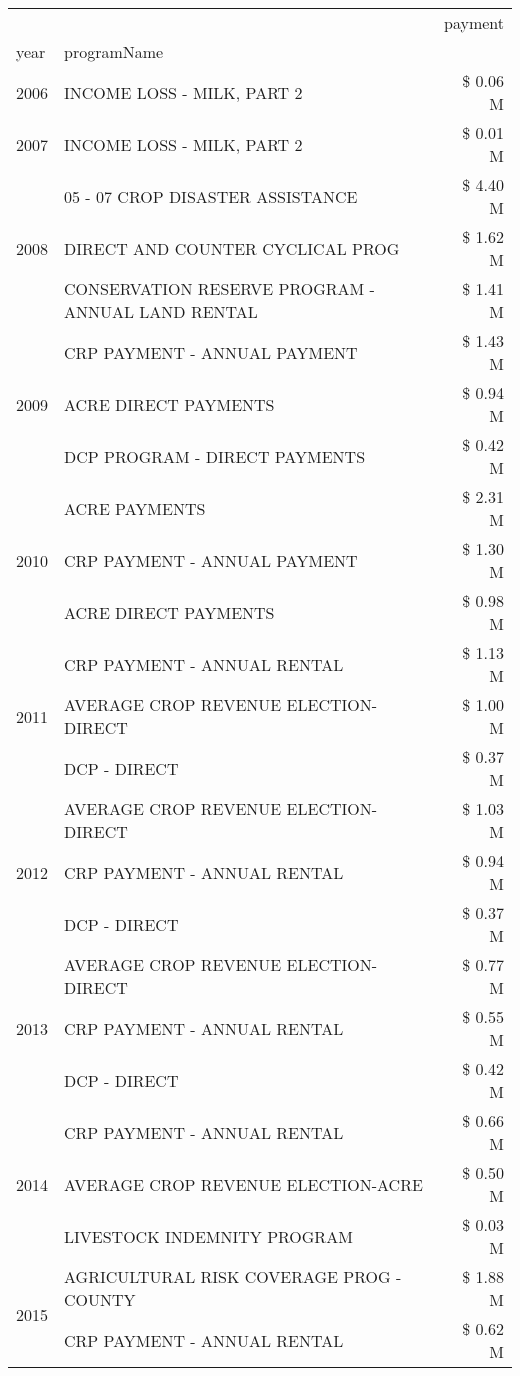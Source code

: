\begin{tabular}{llr}
\toprule
 &  & payment \\
year & programName &  \\
\midrule
2006 & INCOME LOSS - MILK, PART 2 & \$ 0.06 M \\
\cline{1-3}
2007 & INCOME LOSS - MILK, PART 2 & \$ 0.01 M \\
\cline{1-3}
\multirow[t]{3}{*}{2008} & 05 - 07 CROP DISASTER ASSISTANCE & \$ 4.40 M \\
 & DIRECT AND COUNTER CYCLICAL PROG & \$ 1.62 M \\
 & CONSERVATION RESERVE PROGRAM - ANNUAL LAND RENTAL & \$ 1.41 M \\
\cline{1-3}
\multirow[t]{3}{*}{2009} & CRP PAYMENT - ANNUAL PAYMENT & \$ 1.43 M \\
 & ACRE DIRECT PAYMENTS & \$ 0.94 M \\
 & DCP PROGRAM - DIRECT PAYMENTS & \$ 0.42 M \\
\cline{1-3}
\multirow[t]{3}{*}{2010} & ACRE PAYMENTS & \$ 2.31 M \\
 & CRP PAYMENT - ANNUAL PAYMENT & \$ 1.30 M \\
 & ACRE DIRECT PAYMENTS & \$ 0.98 M \\
\cline{1-3}
\multirow[t]{3}{*}{2011} & CRP PAYMENT - ANNUAL RENTAL & \$ 1.13 M \\
 & AVERAGE CROP REVENUE ELECTION-DIRECT & \$ 1.00 M \\
 & DCP - DIRECT & \$ 0.37 M \\
\cline{1-3}
\multirow[t]{3}{*}{2012} & AVERAGE CROP REVENUE ELECTION-DIRECT & \$ 1.03 M \\
 & CRP PAYMENT - ANNUAL RENTAL & \$ 0.94 M \\
 & DCP - DIRECT & \$ 0.37 M \\
\cline{1-3}
\multirow[t]{3}{*}{2013} & AVERAGE CROP REVENUE ELECTION-DIRECT & \$ 0.77 M \\
 & CRP PAYMENT - ANNUAL RENTAL & \$ 0.55 M \\
 & DCP - DIRECT & \$ 0.42 M \\
\cline{1-3}
\multirow[t]{3}{*}{2014} & CRP PAYMENT - ANNUAL RENTAL & \$ 0.66 M \\
 & AVERAGE CROP REVENUE ELECTION-ACRE & \$ 0.50 M \\
 & LIVESTOCK INDEMNITY PROGRAM & \$ 0.03 M \\
\cline{1-3}
\multirow[t]{3}{*}{2015} & AGRICULTURAL RISK COVERAGE PROG - COUNTY & \$ 1.88 M \\
 & CRP PAYMENT - ANNUAL RENTAL & \$ 0.62 M \\

\end{tabular}
